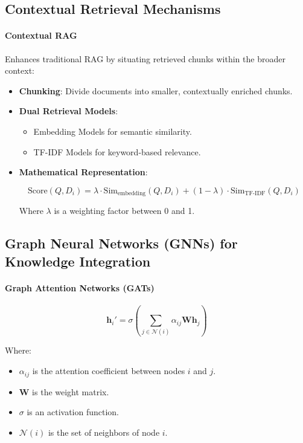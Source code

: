 \documentclass[12pt, a4paper]{article}
\begin{document}
\subsection{Contextual Retrieval Mechanisms}

\paragraph{Contextual RAG}

Enhances traditional RAG by situating retrieved chunks within the broader context:

\begin{itemize}
    \item \textbf{Chunking}: Divide documents into smaller, contextually enriched chunks.
    \item \textbf{Dual Retrieval Models}:
    \begin{itemize}
        \item Embedding Models for semantic similarity.
        \item TF-IDF Models for keyword-based relevance.
    \end{itemize}
    \item \textbf{Mathematical Representation}:

    \begin{equation}
    \text{Score}(Q, D_i) = \lambda \cdot \text{Sim}_{\text{embedding}}(Q, D_i) + (1 - \lambda) \cdot \text{Sim}_{\text{TF-IDF}}(Q, D_i)
    \end{equation}

    Where \( \lambda \) is a weighting factor between 0 and 1.
\end{itemize}

\subsection{Graph Neural Networks (GNNs) for Knowledge Integration}

\paragraph{Graph Attention Networks (GATs)}

\begin{equation}
\mathbf{h}_i' = \sigma\left( \sum_{j \in \mathcal{N}(i)} \alpha_{ij} \mathbf{W} \mathbf{h}_j \right)
\end{equation}

Where:

\begin{itemize}
    \item \( \alpha_{ij} \) is the attention coefficient between nodes \( i \) and \( j \).
    \item \( \mathbf{W} \) is the weight matrix.
    \item \( \sigma \) is an activation function.
    \item \( \mathcal{N}(i) \) is the set of neighbors of node \( i \).
\end{itemize}
\end{document}
